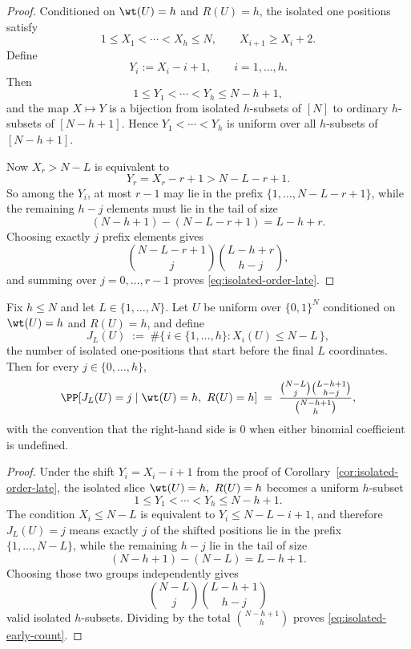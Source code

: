\begin{proof}
Conditioned on \(\wt(U)=h\) and \(R(U)=h\), the isolated one positions satisfy
\[
1\le X_1<\cdots<X_h\le N,
\qquad
X_{i+1}\ge X_i+2.
\]
Define
\[
Y_i:=X_i-i+1,\qquad i=1,\dots,h.
\]
Then
\[
1\le Y_1<\cdots<Y_h\le N-h+1,
\]
and the map \(X\mapsto Y\) is a bijection from isolated \(h\)-subsets of \([N]\) to ordinary \(h\)-subsets of
\([N-h+1]\). Hence \(Y_1<\cdots<Y_h\) is uniform over all \(h\)-subsets of \([N-h+1]\).

Now \(X_r>N-L\) is equivalent to
\[
Y_r=X_r-r+1 > N-L-r+1.
\]
So among the \(Y_i\), at most \(r-1\) may lie in the prefix \(\{1,\dots,N-L-r+1\}\), while the remaining
\(h-j\) elements must lie in the tail of size
\[
(N-h+1)-(N-L-r+1)=L-h+r.
\]
Choosing exactly \(j\) prefix elements gives
\[
\binom{N-L-r+1}{j}\binom{L-h+r}{h-j},
\]
and summing over \(j=0,\dots,r-1\) proves \eqref{eq:isolated-order-late}.
\end{proof}

\begin{corollary}
\label{cor:isolated-early-count}
Fix \(h\le N\) and let \(L\in\{1,\dots,N\}\).
Let \(U\) be uniform over \(\{0,1\}^N\) conditioned on \(\wt(U)=h\) and \(R(U)=h\), and define
\[
J_L(U)
\;:=\;
\#\{\,i\in\{1,\dots,h\}: X_i(U)\le N-L\,\},
\]
the number of isolated one-positions that start before the final \(L\) coordinates.
Then for every \(j\in\{0,\dots,h\}\),
\begin{equation}
\label{eq:isolated-early-count}
\PP[J_L(U)=j \mid \wt(U)=h,\ R(U)=h]
\;=\;
\frac{\binom{N-L}{j}\binom{L-h+1}{h-j}}{\binom{N-h+1}{h}},
\end{equation}
with the convention that the right-hand side is \(0\) when either binomial coefficient is undefined.
\end{corollary}

\begin{proof}
Under the shift \(Y_i=X_i-i+1\) from the proof of Corollary~\ref{cor:isolated-order-late},
the isolated slice \(\wt(U)=h,\ R(U)=h\) becomes a uniform \(h\)-subset
\[
1\le Y_1<\cdots<Y_h\le N-h+1.
\]
The condition \(X_i\le N-L\) is equivalent to \(Y_i\le N-L-i+1\), and therefore
\(J_L(U)=j\) means exactly \(j\) of the shifted positions lie in the prefix \(\{1,\dots,N-L\}\),
while the remaining \(h-j\) lie in the tail of size
\[
(N-h+1)-(N-L)=L-h+1.
\]
Choosing those two groups independently gives
\[
\binom{N-L}{j}\binom{L-h+1}{h-j}
\]
valid isolated \(h\)-subsets. Dividing by the total \(\binom{N-h+1}{h}\) proves
\eqref{eq:isolated-early-count}.
\end{proof}

